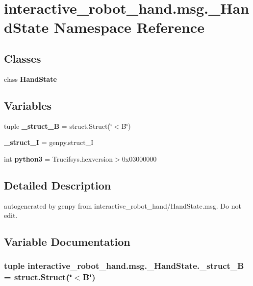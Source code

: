 \section{interactive\-\_\-robot\-\_\-hand.\-msg.\-\_\-\-Hand\-State Namespace Reference}
\label{namespaceinteractive__robot__hand_1_1msg_1_1__HandState}
\subsection*{Classes}
\begin{DoxyCompactItemize}
\item 
class {\bf Hand\-State}
\end{DoxyCompactItemize}
\subsection*{Variables}
\begin{DoxyCompactItemize}
\item 
tuple {\bf \-\_\-struct\-\_\-\-B} = struct.\-Struct(\char`\"{}$<$B\char`\"{})
\item 
{\bf \-\_\-struct\-\_\-\-I} = genpy.\-struct\-\_\-\-I
\item 
int {\bf python3} = Trueifsys.\-hexversion$>$0x03000000
\end{DoxyCompactItemize}


\subsection{Detailed Description}
\begin{DoxyVerb}autogenerated by genpy from interactive_robot_hand/HandState.msg. Do not edit.\end{DoxyVerb}
 

\subsection{Variable Documentation}
\subsubsection[{\-\_\-struct\-\_\-\-B}]{\setlength{\rightskip}{0pt plus 5cm}tuple interactive\-\_\-robot\-\_\-hand.\-msg.\-\_\-\-Hand\-State.\-\_\-struct\-\_\-\-B = struct.\-Struct(\char`\"{}$<$B\char`\"{})}\label{namespaceinteractive__robot__hand_1_1msg_1_1__HandState_a78dd71bfc26e539ab5d488dd06ca45d2}


